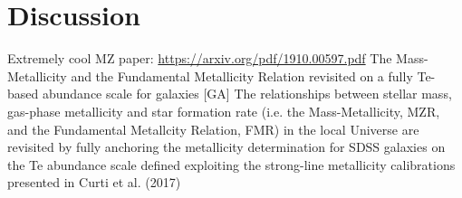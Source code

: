 \documentclass[twocolumn]{aastex63}
\begin{document}
%
%





\section{Discussion }
\label{sec:discussion}
%
%




Extremely cool MZ paper: 
\url{https://arxiv.org/pdf/1910.00597.pdf}
The Mass-Metallicity and the Fundamental Metallicity Relation revisited on a fully Te-based abundance scale for galaxies [GA] The relationships between stellar mass, gas-phase metallicity and star formation rate (i.e. the Mass-Metallicity, MZR, and the Fundamental Metallcity Relation, FMR) in the local Universe are revisited by fully anchoring the metallicity determination for SDSS galaxies on the Te abundance scale defined exploiting the strong-line metallicity calibrations presented in Curti et al. (2017)
\end{document}

